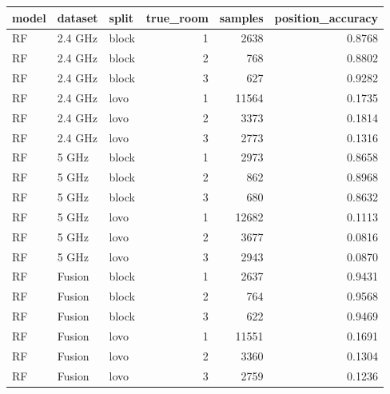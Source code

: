 \begin{tabular}{lllrrr}
\toprule
model & dataset & split & true_room & samples & position_accuracy \\
\midrule
RF & 2.4 GHz & block & 1 & 2638 & 0.8768 \\
RF & 2.4 GHz & block & 2 & 768 & 0.8802 \\
RF & 2.4 GHz & block & 3 & 627 & 0.9282 \\
RF & 2.4 GHz & lovo & 1 & 11564 & 0.1735 \\
RF & 2.4 GHz & lovo & 2 & 3373 & 0.1814 \\
RF & 2.4 GHz & lovo & 3 & 2773 & 0.1316 \\
RF & 5 GHz & block & 1 & 2973 & 0.8658 \\
RF & 5 GHz & block & 2 & 862 & 0.8968 \\
RF & 5 GHz & block & 3 & 680 & 0.8632 \\
RF & 5 GHz & lovo & 1 & 12682 & 0.1113 \\
RF & 5 GHz & lovo & 2 & 3677 & 0.0816 \\
RF & 5 GHz & lovo & 3 & 2943 & 0.0870 \\
RF & Fusion & block & 1 & 2637 & 0.9431 \\
RF & Fusion & block & 2 & 764 & 0.9568 \\
RF & Fusion & block & 3 & 622 & 0.9469 \\
RF & Fusion & lovo & 1 & 11551 & 0.1691 \\
RF & Fusion & lovo & 2 & 3360 & 0.1304 \\
RF & Fusion & lovo & 3 & 2759 & 0.1236 \\
\bottomrule
\end{tabular}
